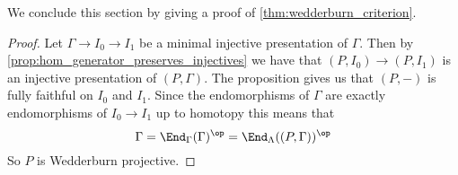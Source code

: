 We conclude this section by giving a proof of \cref{thm:wedderburn_criterion}.

\Wederburncriterion*
\begin{proof}
	Let $\Gamma \to I_0 \to I_1$ be a minimal injective presentation of $\Gamma$. Then by \cref{prop:hom_generator_preserves_injectives} we have that $(P, I_0) \to (P,I_1)$ is an injective presentation of $(P,\Gamma)$. The proposition gives us that $(P,-)$ is fully faithful on $I_0$ and $I_1$. Since the endomorphisms of $\Gamma$ are exactly endomorphisms of $I_0 \to I_1$ up to homotopy this means that $$\Gamma=\End_\Gamma(\Gamma)^{\op} = \End_\Lambda((P, \Gamma))^{\op}$$
	So $P$ is Wedderburn projective.
\end{proof}